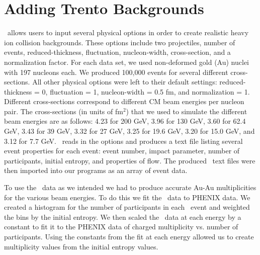 \documentclass[11pt]{article}
\begin{document}
\section{Adding Trento Backgrounds}
%
%
\trento\ allows users to input several physical options in order to create realistic heavy ion collision backgrounds. These options include two projectiles, number of events, reduced-thickness, fluctuation, nucleon-width, cross-section, and a normalization factor. For each data set,  we used non-deformed gold (Au) nuclei with 197 nucleons each. We produced 100,000 events for several different cross-sections. All other physical options were left to their default settings: reduced-thickness = 0, fluctuation = 1, nucleon-width = 0.5 fm, and normalization = 1. Different cross-sections correspond to different CM beam energies per nucleon pair. The cross-sections (in units of fm$^2$) that we used to simulate the different beam energies are as follows: 4.23 for 200 GeV, 3.96 for 130 GeV, 3.60 for 62.4 GeV, 3.43 for 39 GeV, 3.32 for 27 GeV, 3.25 for 19.6 GeV, 3.20 for 15.0 GeV, and 3.12 for 7.7 GeV. \trento\ reads in the options and produces a text file listing several event properties for each event: event number, impact parameter, number of participants, initial entropy, and properties of flow. The produced \trento\ text files were then imported into our programs as an array of event data.

To use the \trento\ data as we intended we had to produce accurate Au-Au multiplicities for the various beam energies. To do this we fit the \trento\ data to PHENIX data. We created a histogram for the number of participants in each \trento\ event and weighted the bins by the initial entropy. We then scaled the \trento\ data at each energy by a constant to fit it to the PHENIX data of charged multiplicity vs. number of participants. Using the constants from the fit at each energy allowed us to create multiplicity values from the initial entropy values.
\end{document}
